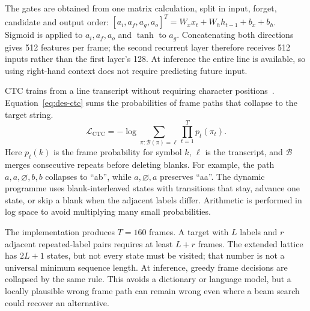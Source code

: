 The gates are obtained from one matrix calculation, split in input, forget, candidate and output order: $[a_i,a_f,a_g,a_o]^T=W_xx_t+W_hh_{t-1}+b_x+b_h$. Sigmoid is applied to $a_i,a_f,a_o$ and $\tanh$ to $a_g$. Concatenating both directions gives 512 features per frame; the second recurrent layer therefore receives 512 inputs rather than the first layer's 128. At inference the entire line is available, so using right-hand context does not require predicting future input.

CTC trains from a line transcript without requiring character positions~\cite[PDF pp.~2--3]{graves2006}. Equation~\ref{eq:des-ctc} sums the probabilities of frame paths that collapse to the target string.
\begin{equation}
\mathcal L_{\mathrm{CTC}}=-\log\sum_{\pi:\mathcal B(\pi)=\boldsymbol\ell}
\prod_{t=1}^{T}p_t(\pi_t).
\label{eq:des-ctc}
\end{equation}
Here $p_t(k)$ is the frame probability for symbol $k$, $\boldsymbol\ell$ is the transcript, and $\mathcal B$ merges consecutive repeats before deleting blanks. For example, the path $a,a,\varnothing,b,b$ collapses to ``ab'', while $a,\varnothing,a$ preserves ``aa''. The dynamic programme uses blank-interleaved states with transitions that stay, advance one state, or skip a blank when the adjacent labels differ. Arithmetic is performed in log space to avoid multiplying many small probabilities.

The implementation produces $T=160$ frames. A target with $L$ labels and $r$ adjacent repeated-label pairs requires at least $L+r$ frames. The extended lattice has $2L+1$ states, but not every state must be visited; that number is not a universal minimum sequence length. At inference, greedy frame decisions are collapsed by the same rule. This avoids a dictionary or language model, but a locally plausible wrong frame path can remain wrong even where a beam search could recover an alternative.

